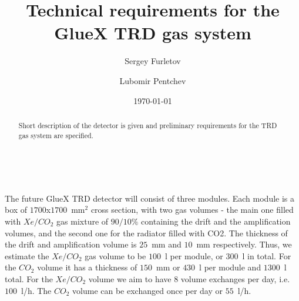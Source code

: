\documentclass[%
preprint,
nofootinbib,
 amsmath,amssymb,
 aps,
floatfix,
]{revtex4-1}
\begin{document}

\title{ 
Technical requirements for the GlueX TRD gas system 
}%
\author{Sergey Furletov}
\author{Lubomir Pentchev}
%



\date{\today}%

\begin{abstract}
Short description of the detector is given and preliminary requirements for the TRD gas system are specified. 
\end{abstract}

\maketitle


\clearpage
\mbox{~}

The future GlueX TRD detector will consist of three modules.
Each module is a box of $1700$x$1700$~mm$^2$ cross section, with two gas volumes - 
the main one filled with $Xe/CO_2$ gas mixture of $90/10\%$ 
containing the drift and the amplification volumes,
and the second one for the radiator filled with CO2. 
The thickness of the drift and amplification volume is $25$~mm and $10$~mm respectively.
Thus, we estimate the $Xe/CO_2$ gas volume to be $100$~l per module, or $300$~l in total.
For the $CO_2$ volume it has a thickness of $150$~mm or $430$~l per module and $1300$~l total.
For the $Xe/CO_2$ volume we aim to have 8 volume exchanges per day, i.e. $100$~l/h.
The $CO_2$ volume can be exchanged once  per day or $55$~l/h.
\end{document}
